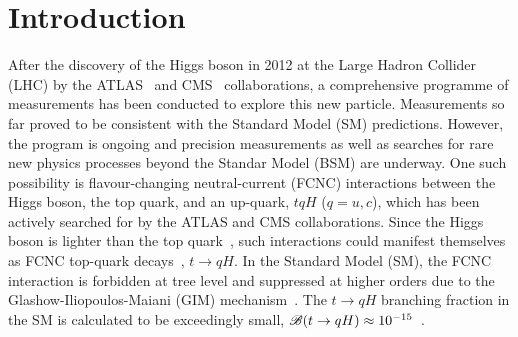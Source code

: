 \section{Introduction}
\label{sec:intro}
After the discovery of the Higgs boson in 2012 at the Large Hadron Collider (LHC) by the ATLAS~\cite{Aad:2012tfa} and 
CMS~\cite{Chatrchyan:2012ufa} collaborations, 
a comprehensive programme of measurements %
has been conducted to explore this new particle. Measurements so far proved to be consistent with the Standard Model (SM) predictions. 
However, the program is ongoing and precision measurements as well as searches for rare new physics processes beyond the Standar Model (BSM)
are underway. One such possibility is flavour-changing neutral-current (FCNC) interactions between the Higgs boson, 
the top quark, and an up-quark, $tqH$ ($q=u, c$), which has been actively searched for by the ATLAS and CMS collaborations.  
Since the Higgs boson is lighter than the top quark~\cite{Aad:2015zhl},
such interactions could manifest themselves as FCNC top-quark decays~\cite{Agashe:2013hma}, $t\to qH$.  
In the Standard Model (SM), the FCNC interaction is forbidden at tree level and suppressed at higher orders due to the Glashow-Iliopoulos-Maiani (GIM) mechanism~\cite{Glashow:1970gm}. The $t\to qH$ branching fraction in the SM is calculated to be exceedingly small, $\mathscr{B}(t\to qH)\approx10^{-15}$~\cite{Eilam:1990zc,Mele:1998ag,AguilarSaavedra:2004wm,Zhang:2013xya}. 

